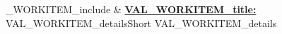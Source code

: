 %
\ifVAL_WORKITEM_include%
        & \href{VAL_WORKITEM_externalLink}{\textbf{VAL_WORKITEM_title:}}%
        {VAL_WORKITEM_detailsShort}%
        {VAL_WORKITEM_details}%
        \\%
        \fi%
